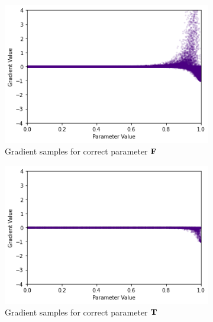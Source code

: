 \begin{figure}[ht]
    \centering
    \begin{subfigure}[b]{0.47\textwidth}
        \centering
        \includegraphics[width=\textwidth]{imgs/grad_ss_bce_falseparam_100dim.png}
        \caption{Gradient samples for correct parameter $\textbf{F}$}
        \label{fig:conjgrad100falsessbce}
    \end{subfigure}
    \begin{subfigure}[b]{0.47\textwidth}
        \centering
        \includegraphics[width=\textwidth]{imgs/grad_ss_bce_trueparam_100dim.png}
        \caption{Gradient samples for correct parameter $\textbf{T}$}
        \label{fig:conjgrad100truessbce}
    \end{subfigure}
    \begin{subfigure}[b]{0.47\textwidth}
        \centering

\end{subfigure}
\end{figure}
